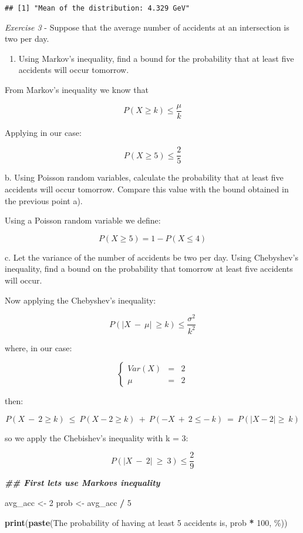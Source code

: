 \documentclass[
]{article}
\newenvironment{Shaded}{\begin{snugshade}}{\end{snugshade}}
\newcommand{\DecValTok}[1]{\textcolor[rgb]{0.00,0.00,0.81}{#1}}
\newcommand{\DocumentationTok}[1]{\textcolor[rgb]{0.56,0.35,0.01}{\textbf{\textit{#1}}}}
\newcommand{\FunctionTok}[1]{\textcolor[rgb]{0.13,0.29,0.53}{\textbf{#1}}}
\newcommand{\NormalTok}[1]{#1}
\newcommand{\OtherTok}[1]{\textcolor[rgb]{0.56,0.35,0.01}{#1}}
\newcommand{\SpecialCharTok}[1]{\textcolor[rgb]{0.81,0.36,0.00}{\textbf{#1}}}
\newcommand{\StringTok}[1]{\textcolor[rgb]{0.31,0.60,0.02}{#1}}
\providecommand{\tightlist}{%
  \setlength{\itemsep}{0pt}\setlength{\parskip}{0pt}}
\begin{document}
\begin{verbatim}
## [1] "Mean of the distribution: 4.329 GeV"
\end{verbatim}

\emph{Exercise 3} - Suppose that the average number of accidents at an
intersection is two per day.

\begin{enumerate}
\def\labelenumi{\alph{enumi})}
\tightlist
\item
  Using Markov's inequality, find a bound for the probability that at
  least five accidents will occur tomorrow.
\end{enumerate}

From Markov's inequality we know that

\[
P(X \ge k) \le \frac{\mu}{k} 
\]

Applying in our case:

\[
P(X \ge 5) \le \frac{2}{5}
\]

b. Using Poisson random variables, calculate the probability that at
least five accidents will occur tomorrow. Compare this value with the
bound obtained in the previous point a).

Using a Poisson random variable we define:

\[
P(X \ge 5) = 1 - P(X \le 4)
\]

c. Let the variance of the number of accidents be two per day. Using
Chebyshev's inequality, find a bound on the probability that tomorrow at
least five accidents will occur.

Now applying the Chebyshev's inequality:

\[
P(|X \ - \ \mu| \ \ge k) \le \frac{\sigma^2}{k^2}
\]

where, in our case:

\[
\begin{cases}
Var(X) &= &2 \\ 
\mu &= &2
\end{cases}
\]

then:

\[
P(X \ - \ 2 \ge k) \ \le \ P(X - 2 \ge k) \ + \ P(-X \ + \ 2 \le  -  \ k) \ = \ P(|X - 2| \ge \ k) 
\]

so we apply the Chebishev's inequality with k = 3:

\[
P(|X \ - \ 2| \ \ge \ 3) \le \frac{2}{9}
\]

\begin{Shaded}
\begin{Highlighting}[]
\DocumentationTok{\#\# First let\textquotesingle{}s use Markov\textquotesingle{}s inequality }

\NormalTok{avg\_acc }\OtherTok{\textless{}{-}} \DecValTok{2}
\NormalTok{prob }\OtherTok{\textless{}{-}}\NormalTok{ avg\_acc }\SpecialCharTok{/} \DecValTok{5}

\FunctionTok{print}\NormalTok{(}\FunctionTok{paste}\NormalTok{(}\StringTok{\textquotesingle{}The probability of having at least 5 accidents is\textquotesingle{}}\NormalTok{, prob }\SpecialCharTok{*} \DecValTok{100}\NormalTok{, }\StringTok{\textquotesingle{}\%\textquotesingle{}}\NormalTok{))}
\end{Highlighting}
\end{Shaded}
\end{document}
